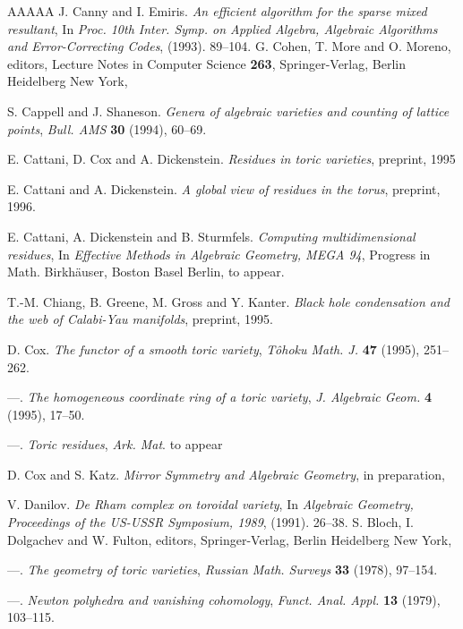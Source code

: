 \documentclass{amsart}
\theoremstyle{plain}
\theoremstyle{definition}
\begin{document}
\begin{thebibliography}{AAAAA}
J. Canny and I. Emiris. \textit{An efficient algorithm for the sparse mixed resultant}, In \textit{Proc. 10th Inter. Symp. on Applied Algebra, Algebraic Algorithms and Error-Correcting Codes}, (1993). 89--104. G. Cohen, T. More and O. Moreno, editors, Lecture Notes in Computer Science \textbf{263}, Springer-Verlag, Berlin Heidelberg New York,

S. Cappell and J. Shaneson. \textit{Genera of algebraic varieties and counting of lattice points}, \textit{Bull. AMS} \textbf{30} (1994), 60--69.

E. Cattani, D. Cox and A. Dickenstein. \textit{Residues in toric varieties}, preprint, 1995 %

E. Cattani and A. Dickenstein. \textit{A global view of residues in the torus}, preprint, 1996.

E. Cattani, A. Dickenstein and B. Sturmfels. \textit{Computing multidimensional residues}, In \textit{Effective Methods in Algebraic Geometry, MEGA 94}, Progress in Math. Birkh\"auser, Boston Basel Berlin, to appear.

T.-M. Chiang, B. Greene, M. Gross and Y. Kanter. \textit{Black hole condensation and the web of Calabi-Yau manifolds}, preprint, 1995.

D. Cox. \textit{The functor of a smooth toric variety}, \textit{T\^ ohoku Math. J.} \textbf{47} (1995), 251--262.

---. \textit{The homogeneous coordinate ring of a toric variety}, \textit{J. Algebraic Geom.} \textbf{4} (1995), 17--50.

---. \textit{Toric residues}, \textit{Ark. Mat}. to appear %

D. Cox and S. Katz. \textit{Mirror Symmetry and Algebraic Geometry}, in preparation,

V. Danilov. \textit{De Rham complex on toroidal variety}, In \textit{Algebraic Geometry, Proceedings of the US-USSR Symposium, 1989}, (1991). 26--38. S. Bloch, I. Dolgachev and W. Fulton, editors, Springer-Verlag, Berlin Heidelberg New York,

---. \textit{The geometry of toric varieties}, \textit{Russian Math. Surveys} \textbf{33} (1978), 97--154.

---. \textit{Newton polyhedra and vanishing cohomology}, \textit{Funct. Anal. Appl.} \textbf{13} (1979), 103--115.


\end{thebibliography}
\end{document}
